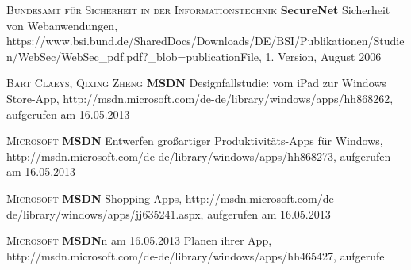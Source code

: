 \begin{thebibliography}{---}
           \textsc{Bundesamt für Sicherheit in der Informationstechnik}
           \textbf{SecureNet}
          Sicherheit von Webanwendungen, https://www.bsi.bund.de/SharedDocs/Downloads/DE/BSI/Publikationen/Studien/WebSec/WebSec\_pdf.pdf?\_blob=publicationFile, 1. Version, August 2006


           \textsc{Bart Claeys, Qixing Zheng}
          \textbf{MSDN}
          Designfallstudie: vom iPad zur Windows Store-App, http://msdn.microsoft.com/de-de/library/windows/apps/hh868262, aufgerufen am 16.05.2013
          
            \textsc{Microsoft}
           \textbf{MSDN}
           Entwerfen großartiger Produktivitäts-Apps für Windows, http://msdn.microsoft.com/de-de/library/windows/apps/hh868273, aufgerufen am 16.05.2013
           
              \textsc{Microsoft}
             \textbf{MSDN}
             Shopping-Apps, http://msdn.microsoft.com/de-de/library/windows/apps/jj635241.aspx, aufgerufen am 16.05.2013
             
                \textsc{Microsoft}
               \textbf{MSDN}n am 16.05.2013
 Planen ihrer App, http://msdn.microsoft.com/de-de/library/windows/apps/hh465427, aufgerufe

 
\end{thebibliography}

